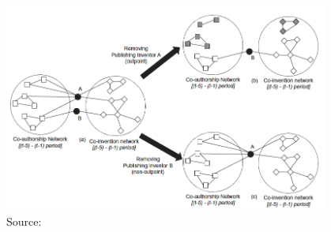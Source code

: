 \documentclass[8pt]{beamer}
\begin{document}

\begin{frame}[fragile]
\frametitle{\insertsection}
\framesubtitle{\insertsubsection}

\centering
\includegraphics[width = 0.8\textwidth]{cattani}\\
\tiny Source: \cite{Cattani2013}

\end{frame}

\end{document}
